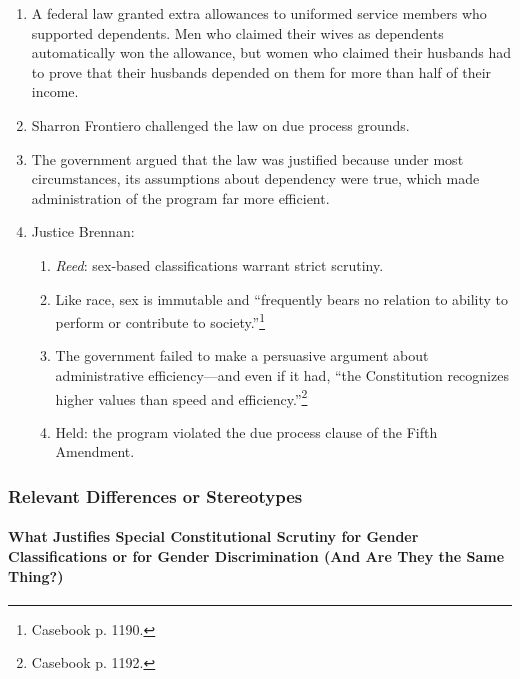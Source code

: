\begin{enumerate}
    \item A federal law granted extra allowances to uniformed service members 
    who supported dependents. Men who claimed their wives as dependents 
    automatically won the allowance, but women who claimed their husbands 
    had to prove that their husbands depended on them for more than half of 
    their income.
    \item Sharron Frontiero challenged the law on due process grounds.
    \item The government argued that the law was justified because under most 
    circumstances, its assumptions about dependency were true, which made 
    administration of the program far more efficient.
    \item Justice Brennan:
    \begin{enumerate}
        \item \emph{Reed}: sex-based classifications warrant strict scrutiny.
        \item Like race, sex is immutable and ``frequently bears no relation 
        to ability to perform or contribute to society.''\footnote{Casebook p. 
        1190.}
        \item The government failed to make a persuasive argument about 
        administrative efficiency---and even if it had, ``the Constitution 
        recognizes higher values than speed and 
        efficiency.''\footnote{Casebook p. 1192.}
        \item Held: the program violated the due process clause of the Fifth 
        Amendment.
    \end{enumerate}
\end{enumerate}

\subsubsection{Relevant Differences or Stereotypes}

\paragraph{What Justifies Special Constitutional Scrutiny for Gender 
Classifications or for Gender Discrimination (And Are They the Same Thing?)}


